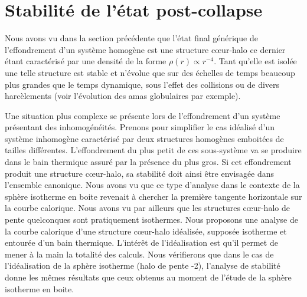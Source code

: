 \section{Stabilité de l'état post-collapse\label{Sec::ToyModel}}

Nous avons vu dans la section précédente que l'état final générique de l'effondrement d'un système homogène est une structure cœur-halo ce dernier
étant caractérisé par une densité de la forme $\rho(r)\propto r^{-4}$. Tant qu'elle est isolée une telle structure est stable et n'évolue que sur des
échelles de temps beaucoup plus grandes que le temps dynamique, sous l'effet des collisions ou de divers harcèlements (voir l'évolution des amas
globulaires par exemple).

Une situation plus complexe se présente lors de l'effondrement d'un système présentant des inhomogénéités. Prenons pour simplifier le cas idéalisé
d'un système inhomogène caractérisé par deux structures homogènes emboitées de tailles différentes. L'effondrement du plus petit de ces sous-système
va se produire dans le bain thermique assuré par la présence du plus gros. Si cet effondrement produit une structure cœur-halo, sa stabilité doit
ainsi être envisagée dans l'ensemble canonique. Nous avons vu que ce type d'analyse dans le contexte de la sphère isotherme en boite revenait à
chercher la première tangente horizontale sur la courbe calorique. Nous avons vu par ailleurs que les structures cœur-halo de pente quelconques
sont pratiquement isothermes. Nous proposons une analyse de la courbe calorique d'une structure cœur-halo idéalisée, supposée
isotherme et entourée d'un bain thermique. L'intérêt de l'idéalisation est qu'il permet de mener à la main la totalité des calculs. Nous vérifierons
que dans le cas de l'idéalisation de la sphère isotherme (halo de pente -2), l'analyse de stabilité donne les mêmes résultats que ceux obtenus au
moment de l'étude de la sphère isotherme en boite.

